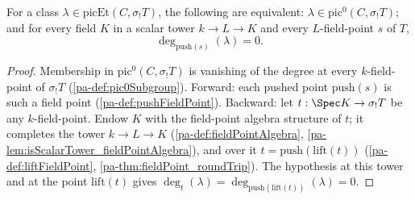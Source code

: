 \begin{theorem}
  \label{pa-thm:mem_pic0Subgroup_iff_forall_pushFieldPoint}
  \leanok

  For a class \(\lambda \in \mathrm{picEt}(C, \sigma_{!}T)\), the following are
  equivalent: \(\lambda \in \mathrm{pic}^0(C, \sigma_{!}T)\); and for every field
  \(K\) in a scalar tower \(k \to L \to K\) and every \(L\)-field-point \(s\) of
  \(T\),
  \[
    \deg_{\mathrm{push}(s)}(\lambda) = 0 .
  \]
\end{theorem}
\begin{proof}
  \leanok
  Membership in \(\mathrm{pic}^0(C, \sigma_{!}T)\) is vanishing of the degree at every
  \(k\)-field-point of \(\sigma_{!}T\) (\ref{pa-def:pic0Subgroup}). Forward: each pushed
  point \(\mathrm{push}(s)\) is such a field point (\ref{pa-def:pushFieldPoint}).
  Backward: let \(t : \Spec K \to \sigma_{!}T\) be any \(k\)-field-point. Endow \(K\)
  with the field-point algebra structure of \(t\); it completes the tower
  \(k \to L \to K\) (\ref{pa-def:fieldPointAlgebra},
  \ref{pa-lem:isScalarTower_fieldPointAlgebra}), and over it
  \(t = \mathrm{push}(\mathrm{lift}(t))\) (\ref{pa-def:liftFieldPoint},
  \ref{pa-thm:fieldPoint_roundTrip}). The hypothesis at this tower and at the point
  \(\mathrm{lift}(t)\) gives
  \(\deg_t(\lambda) = \deg_{\mathrm{push}(\mathrm{lift}(t))}(\lambda) = 0\).
\end{proof}


